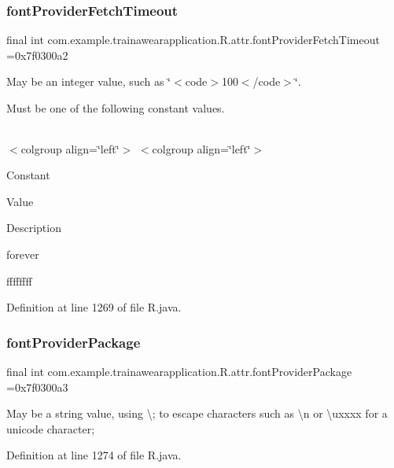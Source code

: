 \subsubsection{\texorpdfstring{fontProviderFetchTimeout}{fontProviderFetchTimeout}}
{\footnotesize\ttfamily final int com.\+example.\+trainawearapplication.\+R.\+attr.\+font\+Provider\+Fetch\+Timeout =0x7f0300a2\hspace{0.3cm}{\ttfamily [static]}}

May be an integer value, such as \char`\"{}$<$code$>$100$<$/code$>$\char`\"{}. 

Must be one of the following constant values.

\tabulinesep=1mm
\begin{longtabu}spread 0pt [c]{*{0}{|X[-1]}|}
\hline
\end{longtabu}
$<$colgroup align=\char`\"{}left\char`\"{}$>$ $<$colgroup align=\char`\"{}left\char`\"{}$>$ 

Constant

Value

Description 

forever

ffffffff

Definition at line 1269 of file R.\+java.

\mbox{\label{classcom_1_1example_1_1trainawearapplication_1_1_r_1_1attr_aba24dd0414d1002606346c40d2da5a96}} 
\subsubsection{\texorpdfstring{fontProviderPackage}{fontProviderPackage}}
{\footnotesize\ttfamily final int com.\+example.\+trainawearapplication.\+R.\+attr.\+font\+Provider\+Package =0x7f0300a3\hspace{0.3cm}{\ttfamily [static]}}

May be a string value, using \textquotesingle{}\textbackslash{};\textquotesingle{} to escape characters such as \textquotesingle{}\textbackslash{}n\textquotesingle{} or \textquotesingle{}\textbackslash{}uxxxx\textquotesingle{} for a unicode character; 

Definition at line 1274 of file R.\+java.

